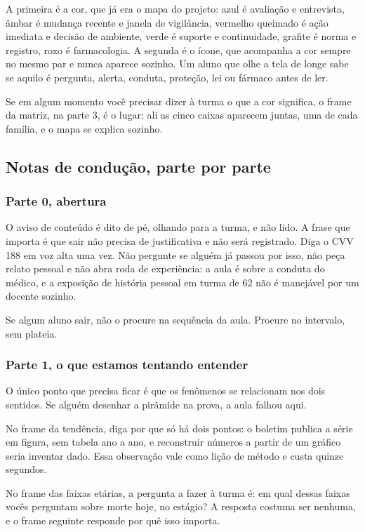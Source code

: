 A primeira é a cor, que já era o mapa do projeto: azul é avaliação e entrevista, âmbar é mudança recente e janela de vigilância, vermelho queimado é ação imediata e decisão de ambiente, verde é suporte e continuidade, grafite é norma e registro, roxo é farmacologia. A segunda é o ícone, que acompanha a cor sempre no mesmo par e nunca aparece sozinho. Um aluno que olhe a tela de longe sabe se aquilo é pergunta, alerta, conduta, proteção, lei ou fármaco antes de ler.

Se em algum momento você precisar dizer à turma o que a cor significa, o frame da matriz, na parte 3, é o lugar: ali as cinco caixas aparecem juntas, uma de cada família, e o mapa se explica sozinho.

\subsection*{Notas de condução, parte por parte}

\subsubsection*{Parte 0, abertura}

O aviso de conteúdo é dito de pé, olhando para a turma, e não lido. A frase que importa é que sair não precisa de justificativa e não será registrado. Diga o CVV 188 em voz alta uma vez. Não pergunte se alguém já passou por isso, não peça relato pessoal e não abra roda de experiência: a aula é sobre a conduta do médico, e a exposição de história pessoal em turma de 62 não é manejável por um docente sozinho.

Se algum aluno sair, não o procure na sequência da aula. Procure no intervalo, sem plateia.

\subsubsection*{Parte 1, o que estamos tentando entender}

O único ponto que precisa ficar é que os fenômenos se relacionam nos dois sentidos. Se alguém desenhar a pirâmide na prova, a aula falhou aqui.

No frame da tendência, diga por que só há dois pontos: o boletim publica a série em figura, sem tabela ano a ano, e reconstruir números a partir de um gráfico seria inventar dado. Essa observação vale como lição de método e custa quinze segundos.

No frame das faixas etárias, a pergunta a fazer à turma é: em qual dessas faixas vocês perguntam sobre morte hoje, no estágio? A resposta costuma ser nenhuma, e o frame seguinte responde por quê isso importa.

